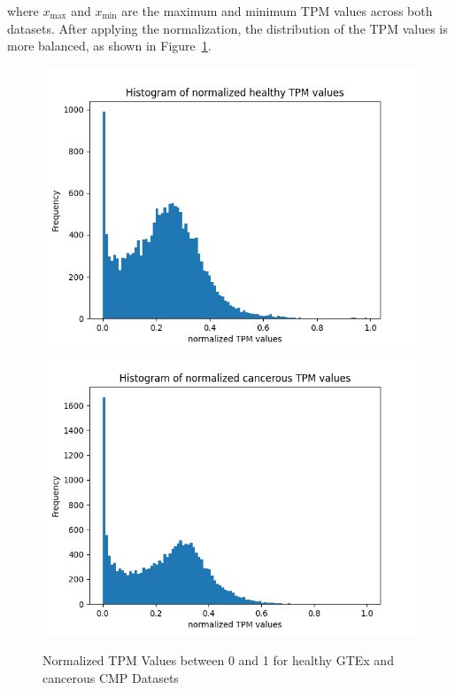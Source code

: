 where $x_{\max}$ and $x_{\min}$ are the maximum and minimum TPM values across both datasets.
After applying the normalization, the distribution of the TPM values is more balanced, as shown in Figure~\ref{fig:03_02_normalized_tpm_both}.

\begin{figure}[h]
    \includegraphics[width=\linewidth]{figures/03_02_normalized_gtex_tpm}
\endminipage
\hfill
{}
  \includegraphics[width=\linewidth]{figures/03_02_normalized_cmp_tpm}
\endminipage
\caption{Normalized TPM Values between 0 and 1 for healthy GTEx and cancerous CMP Datasets}
\label{fig:03_02_normalized_tpm_both}
\end{figure}


